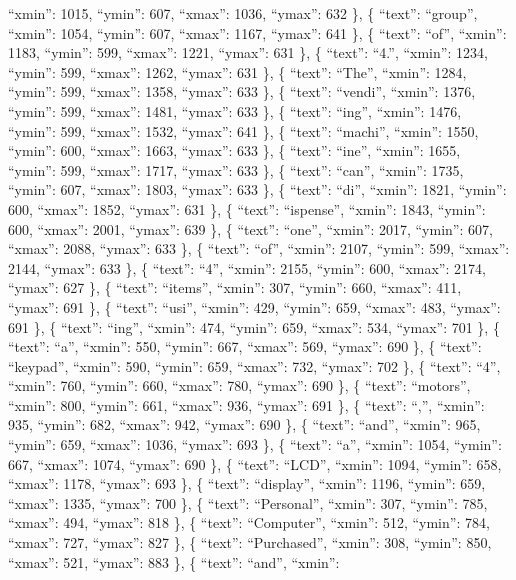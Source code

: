 \documentclass[
]{article}
\begin{document}
``xmin'': 1015, ``ymin'': 607, ``xmax'': 1036, ``ymax'': 632 \}, \{
``text'': ``group'', ``xmin'': 1054, ``ymin'': 607, ``xmax'': 1167,
``ymax'': 641 \}, \{ ``text'': ``of'', ``xmin'': 1183, ``ymin'': 599,
``xmax'': 1221, ``ymax'': 631 \}, \{ ``text'': ``4.'', ``xmin'': 1234,
``ymin'': 599, ``xmax'': 1262, ``ymax'': 631 \}, \{ ``text'': ``The'',
``xmin'': 1284, ``ymin'': 599, ``xmax'': 1358, ``ymax'': 633 \}, \{
``text'': ``vendi'', ``xmin'': 1376, ``ymin'': 599, ``xmax'': 1481,
``ymax'': 633 \}, \{ ``text'': ``ing'', ``xmin'': 1476, ``ymin'': 599,
``xmax'': 1532, ``ymax'': 641 \}, \{ ``text'': ``machi'', ``xmin'':
1550, ``ymin'': 600, ``xmax'': 1663, ``ymax'': 633 \}, \{ ``text'':
``ine'', ``xmin'': 1655, ``ymin'': 599, ``xmax'': 1717, ``ymax'': 633
\}, \{ ``text'': ``can'', ``xmin'': 1735, ``ymin'': 607, ``xmax'': 1803,
``ymax'': 633 \}, \{ ``text'': ``di'', ``xmin'': 1821, ``ymin'': 600,
``xmax'': 1852, ``ymax'': 631 \}, \{ ``text'': ``ispense'', ``xmin'':
1843, ``ymin'': 600, ``xmax'': 2001, ``ymax'': 639 \}, \{ ``text'':
``one'', ``xmin'': 2017, ``ymin'': 607, ``xmax'': 2088, ``ymax'': 633
\}, \{ ``text'': ``of'', ``xmin'': 2107, ``ymin'': 599, ``xmax'': 2144,
``ymax'': 633 \}, \{ ``text'': ``4'', ``xmin'': 2155, ``ymin'': 600,
``xmax'': 2174, ``ymax'': 627 \}, \{ ``text'': ``items'', ``xmin'': 307,
``ymin'': 660, ``xmax'': 411, ``ymax'': 691 \}, \{ ``text'': ``usi'',
``xmin'': 429, ``ymin'': 659, ``xmax'': 483, ``ymax'': 691 \}, \{
``text'': ``ing'', ``xmin'': 474, ``ymin'': 659, ``xmax'': 534,
``ymax'': 701 \}, \{ ``text'': ``a'', ``xmin'': 550, ``ymin'': 667,
``xmax'': 569, ``ymax'': 690 \}, \{ ``text'': ``keypad'', ``xmin'': 590,
``ymin'': 659, ``xmax'': 732, ``ymax'': 702 \}, \{ ``text'': ``4'',
``xmin'': 760, ``ymin'': 660, ``xmax'': 780, ``ymax'': 690 \}, \{
``text'': ``motors'', ``xmin'': 800, ``ymin'': 661, ``xmax'': 936,
``ymax'': 691 \}, \{ ``text'': ``,'', ``xmin'': 935, ``ymin'': 682,
``xmax'': 942, ``ymax'': 690 \}, \{ ``text'': ``and'', ``xmin'': 965,
``ymin'': 659, ``xmax'': 1036, ``ymax'': 693 \}, \{ ``text'': ``a'',
``xmin'': 1054, ``ymin'': 667, ``xmax'': 1074, ``ymax'': 690 \}, \{
``text'': ``LCD'', ``xmin'': 1094, ``ymin'': 658, ``xmax'': 1178,
``ymax'': 693 \}, \{ ``text'': ``display'', ``xmin'': 1196, ``ymin'':
659, ``xmax'': 1335, ``ymax'': 700 \}, \{ ``text'': ``Personal'',
``xmin'': 307, ``ymin'': 785, ``xmax'': 494, ``ymax'': 818 \}, \{
``text'': ``Computer'', ``xmin'': 512, ``ymin'': 784, ``xmax'': 727,
``ymax'': 827 \}, \{ ``text'': ``Purchased'', ``xmin'': 308, ``ymin'':
850, ``xmax'': 521, ``ymax'': 883 \}, \{ ``text'': ``and'', ``xmin'':
\end{document}

